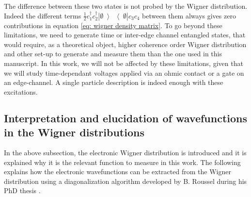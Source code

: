 The difference between these two states is not probed by the Wigner distribution.
Indeed the different terms $\frac{1}{2}c^{\dagger}_{1}c^{\dagger}_{2}\left|\emptyset\left>\right<\emptyset\right|c_{3}c_{4}$ between them always gives zero contributions in equation \eqref{eq: wigner density matrix}.
To go beyond these limitations, we need to generate time or inter-edge channel entangled states, that would require, as a theoretical object, higher coherence order Wigner distribution \cite{thibierge2015coherence,cabart2018measurement} and other set-up to generate and measure them \cite{hofer2017on,chirolli2011time,thibierge2016two} than the one used in this manuscript.
In this work, we will not be affected by these limitations, given that we will study time-dependant voltages applied via an ohmic contact or a gate on an edge-channel.
A single particle description is indeed enough with these excitations.


\subsection{Interpretation and elucidation of wavefunctions in the Wigner distributions}

In the above subsection, the electronic Wigner distribution is introduced and it is explained why it is the relevant function to measure in this work.
The following explains how the electronic wavefunctions can be extracted from the Wigner distribution using a diagonalization algorithm developed by B. Roussel during his PhD thesis \cite{roussel2017autopsy}.

